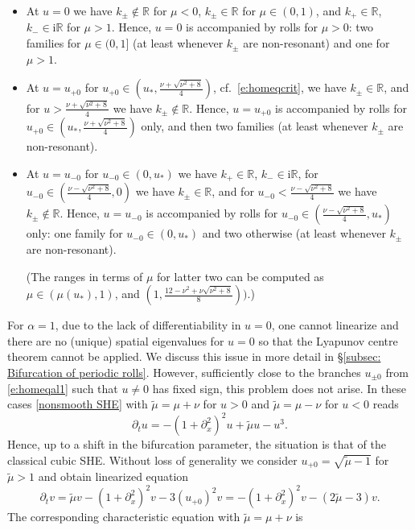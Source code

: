 \documentclass{article}
\numberwithin{equation}{section}
\def\R{\mathbb{R}}
\def\rmi{\mathrm{i}}
\begin{document}
\begin{itemize}
\item At $u=0$ we have $k_\pm\notin \R$ for $\mu<0$, $k_\pm\in\R$ for $\mu\in(0,1)$, and $k_+\in\R$, $k_-\in\rmi\R$ for $\mu>1$. Hence, $u=0$ is accompanied by rolls for $\mu>0$: two families for $\mu\in(0,1]$ (at least whenever $k_\pm$ are non-resonant) and one for $\mu> 1$. 

\item At $u=u_{+0}$ for $u_{+0}\in (u_*,  \frac{\nu + \sqrt{\nu^2 + 8}}{4})$, cf.\ \eqref{e:homeqcrit}, we have $k_\pm\in\R$, and for $u>\frac{\nu + \sqrt{\nu^2 + 8}}{4}$ we have $k_\pm\notin\R$. Hence, $u=u_{+0}$ is accompanied by rolls for $u_{+0}\in (u_*,\frac{\nu + \sqrt{\nu^2 + 8}}{4})$ only, and then two families (at least whenever $k_\pm$ are non-resonant). 

\item At $u=u_{-0}$ for $u_{-0}\in(0,u_*)$ we have $k_+\in\R$, $k_-\in\rmi\R$, for $u_{-0}\in\left(\frac{\nu - \sqrt{\nu^2 + 8}}{4},0\right)$ we have $k_\pm\in\R$, and for $u_{-0}<\frac{\nu - \sqrt{\nu^2 + 8}}{4}$ we have $k_\pm\notin \R$. Hence, $u=u_{-0}$ is accompanied by rolls for 
$u_{-0}\in(\frac{\nu - \sqrt{\nu^2 + 8}}{4},u_*)$ only: one family for $u_{-0}\in(0,u_*)$ and two otherwise (at least whenever $k_\pm$ are non-resonant).


(The ranges in terms of $\mu$ for latter two can be computed as $\mu\in(\mu(u_*),1)$, and $(1,\frac{12-\nu^2+\nu\sqrt{\nu^2+8}}{8})\big)$.)
\end{itemize}
\medskip
For $\alpha=1$, due to the lack of differentiability in $u=0$, one cannot linearize and there are no (unique) spatial eigenvalues for $u=0$ so that the Lyapunov centre theorem cannot be applied. We discuss this issue in more detail in \S\ref{subsec: Bifurcation of periodic rolls}. 
However, sufficiently close to the branches $u_{\pm0}$ from \eqref{e:homeqal1} such that $u\neq 0$ has fixed sign, this problem does not arise. 
In these cases \eqref{nonsmooth SHE} with $\tilde{\mu} = \mu+\nu$ for $u>0$ and $\tilde{\mu}=\mu-\nu$  for $u<0$ reads
\begin{equation}\label{eq:SHcubic}
	\partial_t u = -(1+\partial_x^2)^2 u + \tilde{\mu} u - u^3.
\end{equation} 
Hence, up to a shift in the bifurcation parameter, the situation is that of the classical cubic SHE. Without loss of generality we consider $u_{+0}= \sqrt{\tilde{\mu} -1}$ for $\tilde{\mu}>1$ and obtain linearized equation 
		\begin{equation*}
			\partial_t v = \tilde{\mu} v - (1+\partial_x^2)^2 v - 3(u_{+0})^2 v  = - (1+\partial_x^2)^2 v - (2\tilde{\mu}- 3)v.
		\end{equation*} 
 The corresponding characteristic equation with $\tilde\mu=\mu+\nu$ is
		
\end{document}
